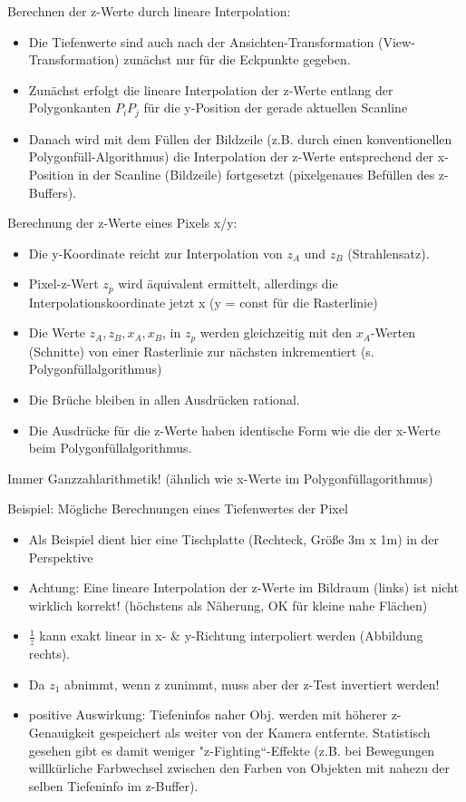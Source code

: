 \documentclass[10pt,landscape]{article}
\begin{document}
\begin{multicols}{3}
Berechnen der z-Werte durch lineare Interpolation:
\begin{itemize}
  \item Die Tiefenwerte sind auch nach der Ansichten-Transformation (View-Transformation) zunächst nur für die Eckpunkte gegeben.
  \item Zunächst erfolgt die lineare Interpolation der z-Werte entlang der Polygonkanten $P_i P_j$ für die y-Position der gerade aktuellen Scanline
  \item Danach wird mit dem Füllen der Bildzeile (z.B. durch einen konventionellen Polygonfüll-Algorithmus) die Interpolation der z-Werte entsprechend der x-Position in der Scanline (Bildzeile) fortgesetzt (pixelgenaues Befüllen des z-Buffers).
\end{itemize}

Berechnung der z-Werte eines Pixels x/y:
\begin{itemize}
  \item Die y-Koordinate reicht zur Interpolation von $z_A$ und $z_B$ (Strahlensatz).
  \item Pixel-z-Wert $z_p$ wird äquivalent ermittelt, allerdings die Interpolationskoordinate jetzt x (y = const für die Rasterlinie)
  \item Die Werte $z_A, z_B, x_A, x_B$, in $z_p$ werden gleichzeitig mit den $x_A$-Werten (Schnitte) von einer Rasterlinie zur nächsten inkrementiert (s. Polygonfüllalgorithmus)
  \item Die Brüche bleiben in allen Ausdrücken rational.
  \item Die Ausdrücke für die z-Werte haben identische Form wie die der x-Werte beim Polygonfüllalgorithmus.
\end{itemize}

Immer Ganzzahlarithmetik! (ähnlich wie x-Werte im Polygonfüllagorithmus)

Beispiel: Mögliche Berechnungen eines Tiefenwertes der Pixel
\begin{itemize}
  \item Als Beispiel dient hier eine Tischplatte (Rechteck, Größe 3m x 1m) in der Perspektive
  \item Achtung: Eine lineare Interpolation der z-Werte im Bildraum (links) ist nicht wirklich korrekt! (höchstens als Näherung, OK für kleine nahe Flächen)
  \item $\frac{1}{z}$ kann exakt linear in x- \& y-Richtung interpoliert werden (Abbildung rechts).
  \item Da $z_1$ abnimmt, wenn z zunimmt, muss aber der z-Test invertiert werden!
  \item positive Auswirkung: Tiefeninfos naher Obj. werden mit höherer z-Genauigkeit gespeichert als weiter von der Kamera entfernte. Statistisch gesehen gibt es damit weniger "z-Fighting“-Effekte (z.B. bei Bewegungen willkürliche Farbwechsel zwischen den Farben von Objekten mit nahezu der selben Tiefeninfo im z-Buffer).
\end{itemize}


\end{multicols}
\end{document}
